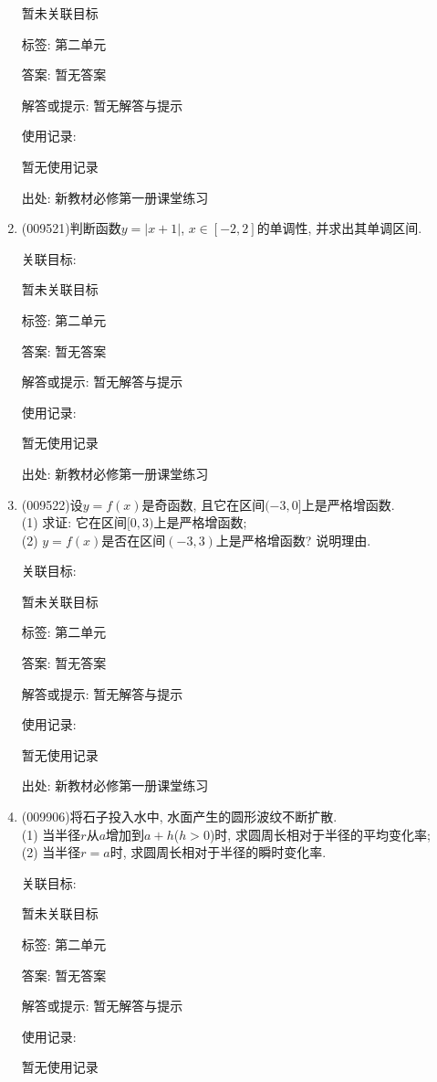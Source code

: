 \documentclass[10pt,a4paper]{article}
\begin{document}
\begin{enumerate}[1.]
暂未关联目标



标签: 第二单元

答案: 暂无答案

解答或提示: 暂无解答与提示

使用记录:

暂无使用记录


出处: 新教材必修第一册课堂练习
\item { (009521)}判断函数$y=|x+1|$, $x\in [-2, 2]$的单调性, 并求出其单调区间.


关联目标:

暂未关联目标



标签: 第二单元

答案: 暂无答案

解答或提示: 暂无解答与提示

使用记录:

暂无使用记录


出处: 新教材必修第一册课堂练习
\item { (009522)}设$y=f(x)$是奇函数, 且它在区间$(-3, 0]$上是严格增函数.\\
(1) 求证: 它在区间$[0, 3)$上是严格增函数;\\
(2) $y=f(x)$是否在区间$(-3, 3)$上是严格增函数? 说明理由.


关联目标:

暂未关联目标



标签: 第二单元

答案: 暂无答案

解答或提示: 暂无解答与提示

使用记录:

暂无使用记录


出处: 新教材必修第一册课堂练习
\item { (009906)}将石子投入水中, 水面产生的圆形波纹不断扩散.\\
(1) 当半径$r$从$a$增加到$a+h$($h>0$)时, 求圆周长相对于半径的平均变化率;\\
(2) 当半径$r=a$时, 求圆周长相对于半径的瞬时变化率.


关联目标:

暂未关联目标



标签: 第二单元

答案: 暂无答案

解答或提示: 暂无解答与提示

使用记录:

暂无使用记录



\end{enumerate}
\end{document}
